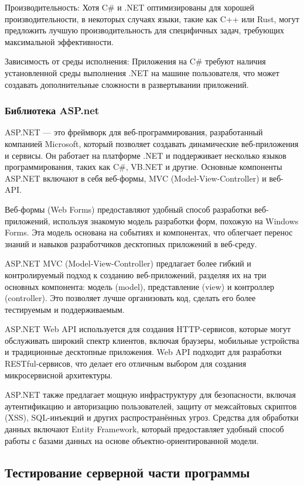 Производительность: Хотя C\# и .NET оптимизированы для хорошей производительности, в некоторых случаях языки, такие как C++ или Rust, могут предложить лучшую производительность для специфичных задач, требующих максимальной эффективности.

Зависимость от среды исполнения: Приложения на C\# требуют наличия установленной среды выполнения .NET на машине пользователя, что может создавать дополнительные сложности в развертывании приложений.

\subsubsection{Библиотека ASP.net}

ASP.NET — это фреймворк для веб-программирования, разработанный компанией Microsoft, который позволяет создавать динамические веб-приложения и сервисы. Он работает на платформе .NET и поддерживает несколько языков программирования, таких как C\#, VB.NET и другие. Основные компоненты ASP.NET включают в себя веб-формы, MVC (Model-View-Controller) и веб-API.

Веб-формы (Web Forms) предоставляют удобный способ разработки веб-приложений, используя знакомую модель разработки форм, похожую на Windows Forms. Эта модель основана на событиях и компонентах, что облегчает перенос знаний и навыков разработчиков десктопных приложений в веб-среду.

ASP.NET MVC (Model-View-Controller) предлагает более гибкий и контролируемый подход к созданию веб-приложений, разделяя их на три основных компонента: модель (model), представление (view) и контроллер (controller). Это позволяет лучше организовать код, сделать его более тестируемым и поддерживаемым.

ASP.NET Web API используется для создания HTTP-сервисов, которые могут обслуживать широкий спектр клиентов, включая браузеры, мобильные устройства и традиционные десктопные приложения. Web API подходит для разработки RESTful-сервисов, что делает его отличным выбором для создания микросервисной архитектуры.

ASP.NET также предлагает мощную инфраструктуру для безопасности, включая аутентификацию и авторизацию пользователей, защиту от межсайтовых скриптов (XSS), SQL-инъекций и других распространённых угроз. Средства для обработки данных включают Entity Framework, который предоставляет удобный способ работы с базами данных на основе объектно-ориентированной модели.

\subsection{Тестирование серверной части программы}
